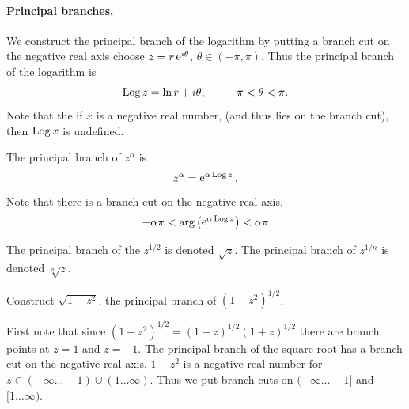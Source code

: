 
\paragraph{Principal branches.}
We construct the principal branch of the logarithm by putting a branch
cut on the negative real axis choose $z = r \mathop{\mathrm{e}}\nolimits^{\imath \theta}$, 
$\theta \in (-\pi,\pi)$.
Thus the principal branch of the logarithm is 
\[
\mathop{\mathrm{Log}}\nolimits z = \ln r + \imath \theta, \qquad -\pi < \theta < \pi.
\]
Note that the if $x$ is a negative real number, (and thus lies on the 
branch cut), then $\mathop{\mathrm{Log}}\nolimits x$ is undefined.

The principal branch of $z^\alpha$ is
\[
z^\alpha = \mathop{\mathrm{e}}\nolimits^{\alpha \mathop{\mathrm{Log}}\nolimits z}.
\]
Note that there is a branch cut on the negative real axis.
\[
-\alpha \pi < \arg\left( \mathop{\mathrm{e}}\nolimits^{\alpha \mathop{\mathrm{Log}}\nolimits z} \right) < \alpha \pi
\]

The principal branch of the $z^{1/2}$ is denoted $\sqrt{z}$.  The 
principal branch of $z^{1/n}$ is denoted $\sqrt[n]{z}$.



\begin{Example}
  Construct $\sqrt{1 - z^2}$, the principal branch of 
  $\left( 1 - z^2 \right)^{1/2}$.

  First note that since $\left( 1 - z^2 \right)^{1/2} = (1 - z)^{1/2}  (1 + z)^{1/2}$ 
  there are branch points at $z = 1$ and $z = -1$.
  The principal branch of the square root has a branch cut on the negative
  real axis.  $1 - z^2$ is a negative real number for $z \in (-\infty \ldots -1)
  \cup (1 \ldots \infty)$.  Thus we put branch cuts on $(-\infty \ldots -1]$ and $[1 \ldots \infty)$.
\end{Example}







